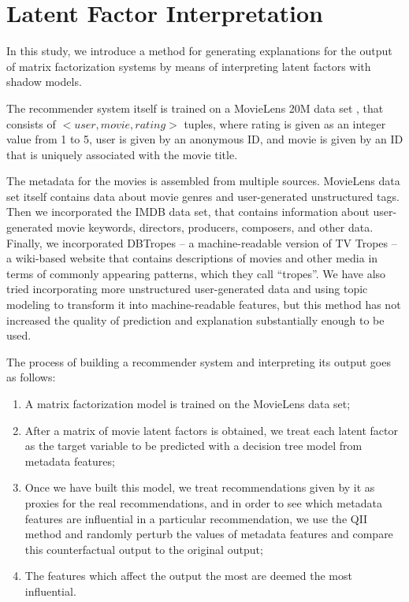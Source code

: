 \chapter{Latent Factor Interpretation}

In this study, we introduce a method for generating explanations for the
output of matrix factorization systems by means of interpreting latent factors
with shadow models.

The recommender system itself is trained on a MovieLens 20M data set
\cite{data-movielens}, that consists of $<user,movie,rating>$ tuples, where
rating is given as an integer value from 1 to 5, user is given by an anonymous
ID, and movie is given by an ID that is uniquely associated with the movie
title.

The metadata for the movies is assembled from multiple sources. MovieLens data
set itself contains data about movie genres and user-generated unstructured
tags. Then we incorporated the IMDB data set\cite{data-imdb}, that contains
information about user-generated movie keywords, directors, producers,
composers, and other data. Finally, we incorporated DBTropes\cite{data-dbtropes}
-- a machine-readable version of TV Tropes -- a wiki-based website that contains
descriptions of movies and other media in terms of commonly appearing patterns,
which they call ``tropes''. We have also tried incorporating more unstructured
user-generated data and using topic modeling to transform it into
machine-readable features, but this method has not increased the quality of
prediction and explanation substantially enough to be used.

The process of building a recommender system and interpreting its output goes
as follows:

\begin{enumerate}
	\item
		A matrix factorization model is trained on the MovieLens data
		set;
	\item
		After a matrix of movie latent factors is obtained, we treat
		each latent factor as the target variable to be predicted with
		a decision tree model from metadata features;
	\item
		Once we have built this model, we treat recommendations given by
		it as proxies for the real recommendations, and in order to see
		which metadata features are influential in a particular
		recommendation, we use the QII method and randomly perturb the
		values of metadata features and compare this counterfactual
		output to the original output;
	\item
		The features which affect the output the most are deemed the
		most influential.
\end{enumerate}


